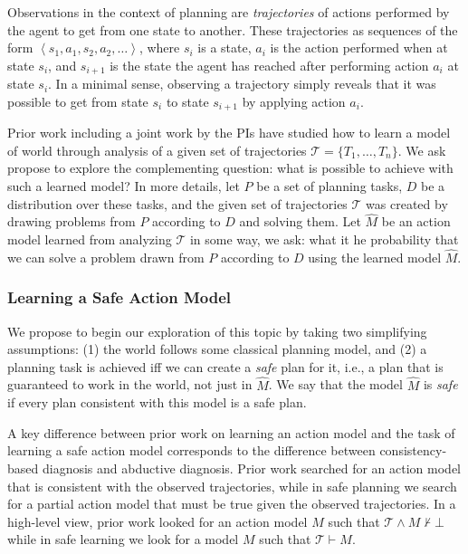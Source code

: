 \documentclass[12pt]{article}
\newcommand{\tuple}[1]{\ensuremath{\left \langle #1 \right \rangle }}
\begin{document}
Observations in the context of planning are {\em trajectories} of actions performed by the agent to get from one state to another. These trajectories as sequences of the form $\tuple{ s_1, a_1, s_2, a_2, \ldots}$, where $s_i$ is a state, $a_i$ is the action performed when at state $s_i$, and $s_{i+1}$ is the state the agent has reached after performing action $a_i$ at state $s_i$. In a minimal sense, observing a trajectory simply reveals that it was possible to get from state $s_i$ to state $s_{i+1}$ by applying action $a_i$. %

Prior work including a joint work by the PIs have studied how to learn a model of world through analysis of a given set of trajectories $\mathcal{T}=\{T_1,\ldots, T_n\}$. 
We ask propose to explore the complementing question: what is possible to achieve with such a learned model?
In more details, let $P$ be a set of planning tasks, 
$D$ be a distribution over these tasks, 
and the given set of trajectories $\mathcal{T}$ 
was created by drawing problems from $P$ according to $D$ and solving them. Let $\hat{M}$ be an action model learned from analyzing $\mathcal{T}$ in some way, we ask: what it he probability that we can solve a problem drawn from $P$ according to $D$ using the learned model $\hat{M}$. 


\subsubsection{Learning a Safe Action Model}
We propose to begin our exploration of this topic by taking two simplifying assumptions: (1) the world follows some classical planning model, and (2) a planning task is achieved iff we can create a \emph{safe} plan for it, i.e., a plan that is guaranteed to work in the world, not just in $\hat{M}$. 
We say that the model $\hat{M}$ is \emph{safe} if every plan consistent with this model is a safe plan. 


A key difference between prior work on learning an action model 
and the task of learning a safe action model corresponds to the difference between
consistency-based diagnosis and abductive diagnosis. 
Prior work searched for an action model that is consistent with the observed trajectories, 
while in safe planning we search for a partial action model that must be true given the observed trajectories. In a high-level view, prior work looked for an action model $M$ such that $\mathcal{T}\wedge M\nvdash\bot$ 
while in safe learning we look for a model $M$ such that $\mathcal{T}\vdash M$. 
\end{document}
